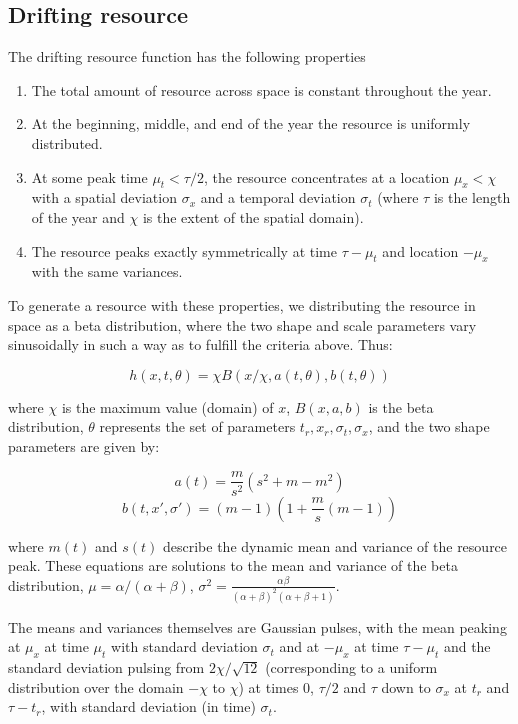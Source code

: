 \documentclass[utf8]{frontiersSCNS} %
\begin{document}
	\subsection{Drifting resource}
	The drifting resource function has the following properties
	
	\begin{enumerate}
		\item The total amount of resource across space is constant throughout the year.
		\item At the beginning, middle, and end of the year the resource is uniformly distributed. 
		\item At some peak time $\mu_t < \tau/2$, the resource concentrates at a location $\mu_x < \chi$ with a spatial deviation $\sigma_x$ and a temporal deviation $\sigma_t$ (where $\tau$ is the length of the year and $\chi$ is the extent of the spatial domain).
		\item The resource peaks exactly symmetrically at time $\tau - \mu_t$ and location $-\mu_x$ with the same variances.
	\end{enumerate}
	
	To generate a resource with these properties, we distributing the resource in space as a beta distribution, where the two shape and scale parameters vary sinusoidally in such a way as to fulfill the criteria above.  Thus:
	
	$$h(x,t, \theta) = \chi B(x/\chi, a(t, \theta), b(t, \theta))$$
	
	where $\chi$ is the maximum value (domain) of $x$, $B(x, a, b)$ is the beta distribution, $\theta$ represents the set of parameters $t_r, x_r, \sigma_t, \sigma_x$, and the two shape parameters are given by:
	
	$$a(t) = \frac{m}{s^2}( s^2 + m - m^2)$$
	$$b(t, x', \sigma') = (m-1)\left(1 + \frac{m}{s}(m-1)\right) $$
	
	where $m(t)$ and $s(t)$ describe the dynamic mean and variance of the resource peak.  These equations are solutions to the mean and variance of the beta distribution, $\mu = \alpha/(\alpha + \beta)$, $\sigma^2 = \frac{\alpha\beta}{(\alpha+\beta)^2(\alpha+\beta+1)}$.
	
	The means and variances themselves are Gaussian pulses, with the mean peaking at $\mu_x$ at time $\mu_t$ with standard deviation $\sigma_t$ and at $-\mu_x$ at time $\tau - \mu_t$ and the standard deviation pulsing from $2 \chi/\sqrt{12}$ (corresponding to a uniform distribution over the domain $-\chi$ to $\chi$) at times 0, $\tau/2$ and $\tau$ down to $\sigma_x$ at $t_r$ and $\tau - t_r$, with standard deviation (in time) $\sigma_t$. 
	
	
\end{document}
